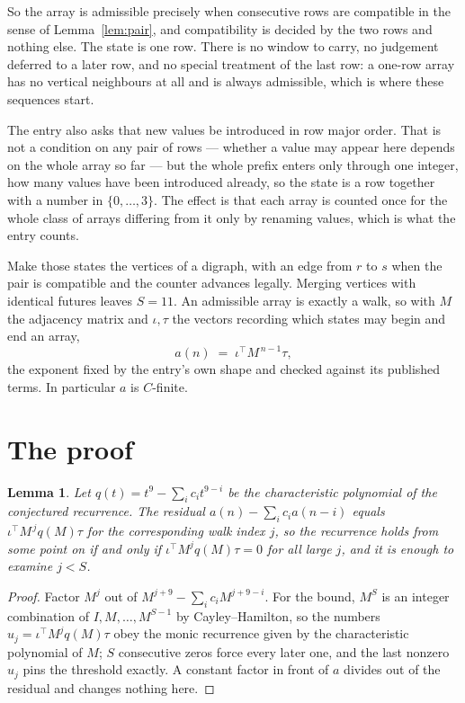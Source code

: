 \documentclass[11pt,a4paper]{article}
\theoremstyle{plain}
\newtheorem{lemma}[theorem]{Lemma}
\theoremstyle{definition}
\begin{document}
So the array is admissible precisely when consecutive rows are compatible in the sense of Lemma~\ref{lem:pair}, and compatibility is decided by the two rows and nothing else. The state is one row. There is no window to carry, no judgement deferred to a later row, and no special treatment of the last row: a one-row array has no vertical neighbours at all and is always admissible, which is where these sequences start.

The entry also asks that new values be introduced in row major order. That is not a condition on any pair of rows --- whether a value may appear here depends on the whole array so far --- but the whole prefix enters only through one integer, how many values have been introduced already, so the state is a row together with a number in $\{0,\dots,3\}$. The effect is that each array is counted once for the whole class of arrays differing from it only by renaming values, which is what the entry counts.

Make those states the vertices of a digraph, with an edge from $r$ to $s$ when the pair is compatible and the counter advances legally. Merging vertices with identical futures leaves $S=11$. An admissible array is exactly a walk, so with $M$ the adjacency matrix and $\iota,\tau$ the vectors recording which states may begin and end an array,
\[
a(n)\;=\;\iota^{\!\top}M^{\,n-1}\tau ,
\]
the exponent fixed by the entry's own shape and checked against its published terms. In
particular $a$ is $C$-finite.

\section{The proof}

\begin{lemma}\label{lem:crit}
Let $q(t)=t^{9}-\sum_i c_it^{9-i}$ be the characteristic polynomial of the
conjectured recurrence. The residual $a(n)-\sum_ic_ia(n-i)$ equals
$\iota^{\!\top}M^{\,j}q(M)\tau$ for the corresponding walk index $j$, so the recurrence
holds from some point on if and only if $\iota^{\!\top}M^{j}q(M)\tau=0$ for all large $j$,
and it is enough to examine $j<S$.
\end{lemma}

\begin{proof}
Factor $M^{j}$ out of $M^{j+9}-\sum_ic_iM^{j+9-i}$. For the bound, $M^{S}$
is an integer combination of $I,M,\dots,M^{S-1}$ by Cayley--Hamilton, so the numbers
$u_j=\iota^{\!\top}M^{j}q(M)\tau$ obey the monic recurrence given by the characteristic
polynomial of $M$; $S$ consecutive zeros force every later one, and the last nonzero $u_j$
pins the threshold exactly. A constant factor in front of $a$ divides out of the residual and
changes nothing here.
\end{proof}
\end{document}
